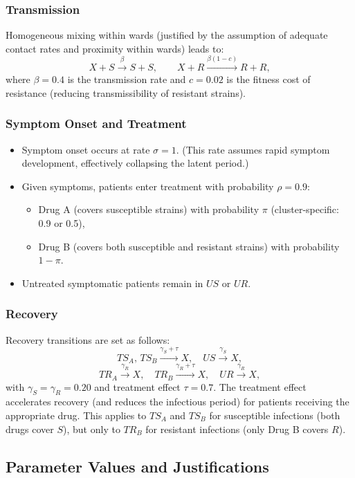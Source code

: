 \documentclass[preprint,11pt]{elsarticle}
\begin{document}
\subsubsection{Transmission}
Homogeneous mixing within wards (justified by the assumption of adequate contact rates and proximity within wards) leads to:
\[
  X + S \xrightarrow{\beta} S + S, \qquad
  X + R \xrightarrow{\beta(1 - c)} R + R,
\]
where $\beta = 0.4$ is the transmission rate and $c = 0.02$ is the fitness cost of resistance (reducing transmissibility of resistant strains).

\subsubsection{Symptom Onset and Treatment}
\begin{itemize}
  \item Symptom onset occurs at rate $\sigma = 1$. (This rate assumes rapid symptom development, effectively collapsing the latent period.)
  \item Given symptoms, patients enter treatment with probability $\rho = 0.9$:
    \begin{itemize}
      \item Drug A (covers susceptible strains) with probability $\pi$ (cluster-specific: 0.9 or 0.5),
      \item Drug B (covers both susceptible and resistant strains) with probability $1 - \pi$.
    \end{itemize}
  \item Untreated symptomatic patients remain in $US$ or $UR$.
\end{itemize}

\subsubsection{Recovery}
Recovery transitions are set as follows:
\[
  TS_A,\, TS_B \xrightarrow{\gamma_S + \tau} X, \quad
  US \xrightarrow{\gamma_S} X,
\]
\[
  TR_A \xrightarrow{\gamma_R} X, \quad
  TR_B \xrightarrow{\gamma_R + \tau} X, \quad
  UR \xrightarrow{\gamma_R} X,
\]
with $\gamma_S = \gamma_R = 0.20$ and treatment effect $\tau = 0.7$. The treatment effect accelerates recovery (and reduces the infectious period) for patients receiving the appropriate drug. This applies to $TS_A$ and $TS_B$ for susceptible infections (both drugs cover $S$), but only to $TR_B$ for resistant infections (only Drug B covers $R$).

\subsection{Parameter Values and Justifications}
\end{document}

